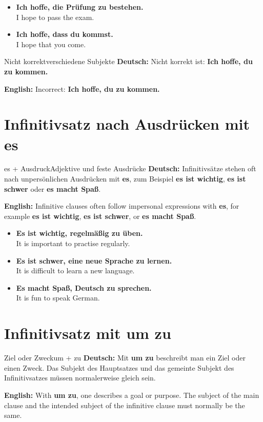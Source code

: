 \documentclass[a4paper,11pt]{article}
\newcommand{\GermanText}[1]{\textbf{Deutsch: }#1\par}
\newcommand{\EnglishText}[1]{{\small\color{SoftGray}\textbf{English: }#1\par}}
\newcommand{\ExampleItem}[2]{\item \textbf{#1}\\{\small\color{SoftGray}#2}}
\begin{document}
        \begin{exbox}
            \begin{itemize}
                \ExampleItem{Ich hoffe, die Prüfung zu bestehen.}{I hope to pass the exam.}
                \ExampleItem{Ich hoffe, dass du kommst.}{I hope that you come.}
            \end{itemize}
        \end{exbox}

        \begin{grammarentry}{Nicht korrekt}{verschiedene Subjekte}
            \GermanText{Nicht korrekt ist: \textbf{Ich hoffe, du zu kommen.}}
            \EnglishText{Incorrect: \textbf{Ich hoffe, du zu kommen.}}
        \end{grammarentry}


    \section{Infinitivsatz nach Ausdrücken mit \glqq es\grqq}

        \begin{grammarentry}{es + Ausdruck}{Adjektive und feste Ausdrücke}
            \GermanText{Infinitivsätze stehen oft nach unpersönlichen Ausdrücken mit \textbf{es}, zum Beispiel \textbf{es ist wichtig}, \textbf{es ist schwer} oder \textbf{es macht Spaß}.}
            \EnglishText{Infinitive clauses often follow impersonal expressions with \textbf{es}, for example \textbf{es ist wichtig}, \textbf{es ist schwer}, or \textbf{es macht Spaß}.}
        \end{grammarentry}

        \begin{exbox}
            \begin{itemize}
                \ExampleItem{Es ist wichtig, regelmäßig zu üben.}{It is important to practise regularly.}
                \ExampleItem{Es ist schwer, eine neue Sprache zu lernen.}{It is difficult to learn a new language.}
                \ExampleItem{Es macht Spaß, Deutsch zu sprechen.}{It is fun to speak German.}
            \end{itemize}
        \end{exbox}


    \section{Infinitivsatz mit \glqq um zu\grqq}

        \begin{grammarentry}{Ziel oder Zweck}{um + zu}
            \GermanText{Mit \textbf{um zu} beschreibt man ein Ziel oder einen Zweck. Das Subjekt des Hauptsatzes und das gemeinte Subjekt des Infinitivsatzes müssen normalerweise gleich sein.}
            \EnglishText{With \textbf{um zu}, one describes a goal or purpose. The subject of the main clause and the intended subject of the infinitive clause must normally be the same.}
        \end{grammarentry}
\end{document}
